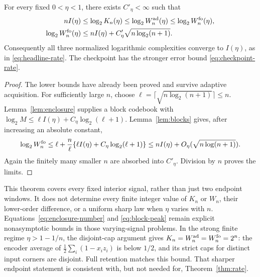 \begin{theorem}\label{thm:rate}
For every fixed $0<\eta<1$, there exists $C'_\eta<\infty$ such that
\begin{align}
 nI(\eta)&\le\log_2 K_n(\eta)
       \le\log_2 W_n^{\rm ad}(\eta)
       \le\log_2 W_n^{\rm fo}(\eta),\label{eq:rate-lower}\\
 \log_2 W_n^{\rm fo}(\eta)&\le
          nI(\eta)+C'_\eta\sqrt{n\log_2(n+1)}.
                                             \label{eq:rate-upper}
\end{align}
Consequently all three normalized logarithmic complexities converge
to $I(\eta)$, as in \eqref{eq:headline-rate}. The checkpoint has the
stronger error bound \eqref{eq:checkpoint-rate}.
\end{theorem}
\begin{proof}
The lower bounds have already been proved and survive adaptive
acquisition. For sufficiently large $n$, choose
$\ell=\lceil\sqrt{n\log_2(n+1)}\rceil\le n$.
Lemma~\ref{lem:enclosure} supplies a block codebook with
$\log_2 M\le\ell I(\eta)+C_\eta\log_2(\ell+1)$.
Lemma~\ref{lem:blocks} gives, after increasing an absolute constant,
\[
 \log_2 W_n^{\rm fo}
 \le\ell+\frac n\ell\{\ell I(\eta)+C_\eta\log_2(\ell+1)\}
 \le nI(\eta)+O_\eta(\sqrt{n\log(n+1)}).
\]
Again the finitely many smaller $n$ are absorbed into $C'_\eta$.
Division by $n$ proves the limits.
\end{proof}
This theorem covers every fixed interior signal, rather than just two
endpoint windows. It does not determine every finite integer value of
$K_n$ or $W_n$, their lower-order difference, or a uniform sharp law
when $\eta$ varies with $n$. Equations~\eqref{eq:enclosure-number} and
\eqref{eq:block-peak} remain explicit nonasymptotic bounds in those
varying-signal problems. In the strong finite regime
$\eta>1-1/n$, the disjoint-cap argument gives $K_n=W_n^{\rm ad}
=W_n^{\rm fo}=2^n$: the encoder average of
$\frac12\sum_i(1-x_i z_i)$ is below $1/2$, and its strict caps for
distinct input corners are disjoint. Full retention matches this bound.
That sharper endpoint statement is consistent with, but not needed for,
Theorem~\ref{thm:rate}.
